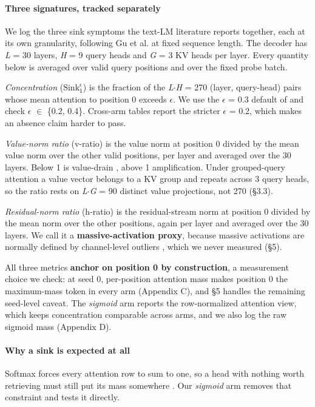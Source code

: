 \documentclass{article}
\begin{document}
\paragraph{Three signatures, tracked separately} We log the three sink symptoms the text-LM literature reports together, each at its own granularity, following Gu et al. \cite{ref6} at fixed sequence length. The decoder has \textit{L} = 30 layers, \textit{H} = 9 query heads and \textit{G} = 3 KV heads per layer. Every quantity below is averaged over valid query positions and over the fixed probe batch.

\textit{Concentration} ($\mathrm{Sink}^{\epsilon}_{1}$) is the fraction of the \textit{L$\cdot$H} = 270 (layer, query-head) pairs whose mean attention to position 0 exceeds $\epsilon$. We use the $\epsilon$ = 0.3 default of \cite{ref6} and check $\epsilon$ $\in$ \{0.2, 0.4\}. Cross-arm tables report the stricter $\epsilon$ = 0.2, which makes an absence claim harder to pass.

\textit{Value-norm ratio} (v-ratio) is the value norm at position 0 divided by the mean value norm over the other valid positions, per layer and averaged over the 30 layers. Below 1 is value-drain \cite{ref4}, above 1 amplification. Under grouped-query attention a value vector belongs to a KV group and repeats across 3 query heads, so the ratio rests on \textit{L$\cdot$G} = 90 distinct value projections, not 270 (\S3.3).

\textit{Residual-norm ratio} (h-ratio) is the residual-stream norm at position 0 divided by the mean norm over the other positions, again per layer and averaged over the 30 layers. We call it a \textbf{massive-activation proxy}, because massive activations are normally defined by channel-level outliers \cite{ref2,ref5}, which we never measured (\S5).

All three metrics \textbf{anchor on position 0 by construction}, a measurement choice we check: at seed 0, per-position attention mass makes position 0 the maximum-mass token in every arm (Appendix C), and \S5 handles the remaining seed-level caveat. The \textit{sigmoid} arm reports the row-normalized attention view, which keeps concentration comparable across arms, and we also log the raw sigmoid mass (Appendix D).

\paragraph{Why a sink is expected at all} Softmax forces every attention row to sum to one, so a head with nothing worth retrieving must still put its mass somewhere \cite{ref6}. Our \textit{sigmoid} arm removes that constraint and tests it directly.
\end{document}
